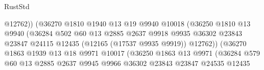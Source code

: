 \begin{lexlean}{RustStd}
\begin{coremodule}
                                            @12762))
                                        (@36270
                                          @1810
                                          @1940
                                          @13
                                          @19
                                          @9940
                                          @10018
                                          (@36250
                                            @1810
                                            @13
                                            @9940
                                            (@36284
                                              @502
                                              @60
                                              @13
                                              @2885
                                              @2637
                                              @9918
                                              @9935
                                              @36302
                                              @23843
                                              @23847
                                              @24115
                                              @12435
                                              (@12165 (@17537 @9935 @9919))
                                              @12762))
                                          (@36270
                                            @1863
                                            @1939
                                            @13
                                            @18
                                            @9971
                                            @10017
                                            (@36250
                                              @1863
                                              @13
                                              @9971
                                              (@36284
                                                @579
                                                @60
                                                @13
                                                @2885
                                                @2637
                                                @9945
                                                @9966
                                                @36302
                                                @23843
                                                @23847
                                                @24535
                                                @12435

\end{coremodule}
\end{lexlean}
